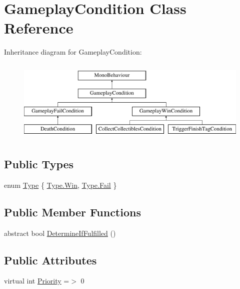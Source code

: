 \hypertarget{class_gameplay_condition}{}\section{Gameplay\+Condition Class Reference}
\label{class_gameplay_condition}
Inheritance diagram for Gameplay\+Condition\+:\begin{figure}[H]
\begin{center}
\leavevmode
\includegraphics[height=4.000000cm]{class_gameplay_condition}
\end{center}
\end{figure}
\subsection*{Public Types}
\begin{DoxyCompactItemize}
\item 
enum \mbox{\hyperlink{class_gameplay_condition_af7549fe9ce5328062dab831d05ca9702}{Type}} \{ \mbox{\hyperlink{class_gameplay_condition_af7549fe9ce5328062dab831d05ca9702a119eac47719cc9be7b99124712e229da}{Type.\+Win}}, 
\mbox{\hyperlink{class_gameplay_condition_af7549fe9ce5328062dab831d05ca9702aceaa0734f0b3c738120c67344d8f3ec1}{Type.\+Fail}}
 \}
\end{DoxyCompactItemize}
\subsection*{Public Member Functions}
\begin{DoxyCompactItemize}
\item 
abstract bool \mbox{\hyperlink{class_gameplay_condition_a7788119247b929ae43f7c134767e589e}{Determine\+If\+Fulfilled}} ()
\end{DoxyCompactItemize}
\subsection*{Public Attributes}
\begin{DoxyCompactItemize}
\item 
virtual int \mbox{\hyperlink{class_gameplay_condition_ac7d724206816d7bfd2e584d2c9de624c}{Priority}} =$>$ 0
\end{DoxyCompactItemize}
